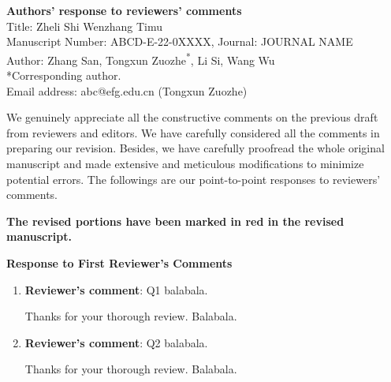 \documentclass[11pt]{article}
\renewcommand{\baselinestretch}{1.25}
\begin{document}
\vspace{1.5cm}
\begin{minipage}[t]{\textwidth}
      \centering
      \begin{minipage}[t]{0.8\textwidth}
            \begin{center}
                  {\bf \Large Authors' response to reviewers' comments} \\
                  Title: Zheli Shi Wenzhang Timu \\
                  Manuscript Number: ABCD-E-22-0XXXX, Journal: JOURNAL NAME \\
                  Author: Zhang San, Tongxun Zuozhe\textsuperscript{*}, Li Si, Wang Wu \\
                  *Corresponding author. \\
                  Email address: abc@efg.edu.cn (Tongxun Zuozhe) \\
            \end{center}
      \end{minipage}
\end{minipage}

\vspace{1.5cm}


\renewcommand{\baselinestretch}{1.0}

We genuinely appreciate all the constructive comments on the previous draft from reviewers and editors. We have carefully considered all the comments in preparing our revision. Besides, we have carefully proofread the whole original manuscript and made extensive and meticulous modifications to minimize potential errors. The followings are our point-to-point responses to reviewers' comments.

      {\bf The revised portions have been marked in red in the revised manuscript.}

\vspace{0.5cm}
\begin{center}
      {\bf \large Response to First Reviewer's Comments}
\end{center}


\begin{enumerate}
      \item {\bf Reviewer's comment}: { Q1 balabala.}

             Thanks for your thorough review. Balabala.


      \item {\bf Reviewer's comment}: { Q2 balabala.}

             Thanks for your thorough review. Balabala.


\end{enumerate}
\end{document}
